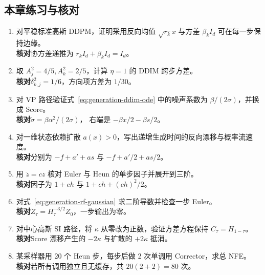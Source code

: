 \subsection*{本章练习与核对}

\begin{enumerate}
 \item 对平稳标准高斯 DDPM，证明采用反向均值 \(\sqrt{r_k}x\)
 与方差 \(\beta_kI_d\) 可在每一步保持边缘。\\
 \textbf{核对}\quad 协方差递推为 \(r_kI_d+\beta_kI_d=I_d\)。
 \item 取 \(A_j^2=4/5,A_k^2=2/5\)，计算 \(\eta=1\) 的 DDIM 跨步方差。\\
 \textbf{核对}\quad \(\delta_{k,j}^2=1/6\)，方向项方差为 \(1/30\)。
 \item 对 VP 路径验证式~\eqref{eq:generation-ddim-ode} 中的噪声系数为
 \(\beta/(2\sigma)\)，并换成 Score。\\
 \textbf{核对}\quad \(\dot\sigma=\beta\alpha^2/(2\sigma)\)，
 右端是 \(-\beta x/2-\beta s/2\)。
 \item 对一维状态依赖扩散 \(a(x)>0\)，写出递增生成时间的反向漂移与概率流速度。\\
 \textbf{核对}\quad 分别为 \(-f+a'+a s\) 与 \(-f+a'/2+a s/2\)。
 \item 用 \(\dot z=cz\) 核对 Euler 与 Heun 的单步因子并展开到三阶。\\
 \textbf{核对}\quad 因子为 \(1+ch\) 与 \(1+ch+(ch)^2/2\)。
 \item 对式~\eqref{eq:generation-rf-gaussian} 求二阶导数并检查一步 Euler。\\
 \textbf{核对}\quad \(\ddot Z_\tau=H_\tau^{-3/2}Z_0\)，一步输出为零。
 \item 对中心高斯 SI 路径，将 \(\kappa\) 从零改为正数，验证方差方程保持
 \(C_\tau=H_{1-\tau}\)。\\
 \textbf{核对}\quad Score 漂移产生的 \(-2\kappa\) 与扩散的 \(+2\kappa\) 抵消。
 \item 某采样器用 20 个 Heun 步，每步后做 2 次单调用 Corrector，求总 NFE。\\
 \textbf{核对}\quad 若所有调用独立且无缓存，共 \(20(2+2)=80\) 次。
\end{enumerate}
